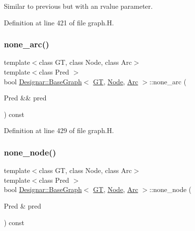 Similar to previous but with an rvalue parameter. 



Definition at line 421 of file graph.\+H.

\mbox{\label{class_designar_1_1_base_graph_a69c4841b8c517a510d738bc1204da7b7}} 
\subsubsection{\texorpdfstring{none\+\_\+arc()}{none\_arc()}\hspace{0.1cm}{\footnotesize\ttfamily [2/2]}}
{\footnotesize\ttfamily template$<$class GT, class Node, class Arc$>$ \\
template$<$class Pred $>$ \\
bool \hyperlink{class_designar_1_1_base_graph}{Designar\+::\+Base\+Graph}$<$ \hyperlink{demo-buildgraph_8_c_a3001c40d2c31ca87ed96cd7d1334a55e}{GT}, \hyperlink{namespace_designar_a5af326c65aa2bd26b26c410f2030d09e}{Node}, \hyperlink{namespace_designar_a3f55fb5513d62ff47cbc8f72b8e95d6f}{Arc} $>$\+::none\+\_\+arc (\begin{DoxyParamCaption}\item[{Pred \&\&}]{pred }\end{DoxyParamCaption}) const\hspace{0.3cm}{\ttfamily [inline]}}



Definition at line 429 of file graph.\+H.

\mbox{\label{class_designar_1_1_base_graph_aa87c903e7fbf82a30edc9e442a115050}} 
\subsubsection{\texorpdfstring{none\+\_\+node()}{none\_node()}\hspace{0.1cm}{\footnotesize\ttfamily [1/2]}}
{\footnotesize\ttfamily template$<$class GT, class Node, class Arc$>$ \\
template$<$class Pred $>$ \\
bool \hyperlink{class_designar_1_1_base_graph}{Designar\+::\+Base\+Graph}$<$ \hyperlink{demo-buildgraph_8_c_a3001c40d2c31ca87ed96cd7d1334a55e}{GT}, \hyperlink{namespace_designar_a5af326c65aa2bd26b26c410f2030d09e}{Node}, \hyperlink{namespace_designar_a3f55fb5513d62ff47cbc8f72b8e95d6f}{Arc} $>$\+::none\+\_\+node (\begin{DoxyParamCaption}\item[{Pred \&}]{pred }\end{DoxyParamCaption}) const\hspace{0.3cm}{\ttfamily [inline]}}



